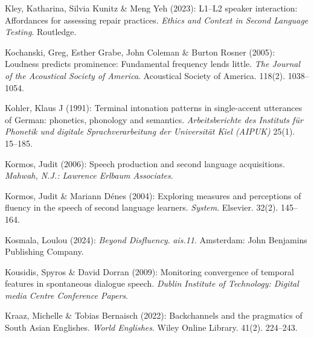 \begin{styleBibliography}
Kley, Katharina, Silvia Kunitz \& Meng Yeh (2023): L1–L2 speaker interaction: Affordances for assessing repair practices. \textit{Ethics and Context in Second Language Testing}. Routledge.
\end{styleBibliography}

\begin{styleBibliography}
Kochanski, Greg, Esther Grabe, John Coleman \& Burton Rosner (2005): Loudness predicts prominence: Fundamental frequency lends little. \textit{The Journal of the Acoustical Society of America}. Acoustical Society of America. 118(2). 1038–1054.
\end{styleBibliography}

\begin{styleBibliography}
Kohler, Klaus J (1991): Terminal intonation patterns in single-accent utterances of German: phonetics, phonology and semantics. \textit{Arbeitsberichte des Instituts für Phonetik und digitale Sprachverarbeitung der Universität Kiel (AIPUK)} 25(1). 15–185.
\end{styleBibliography}

\begin{styleBibliography}
Kormos, Judit (2006): Speech production and second language acquisitions. \textit{Mahwah, N.J.: Lawrence Erlbaum Associates}.
\end{styleBibliography}

\begin{styleBibliography}
Kormos, Judit \& Mariann Dénes (2004): Exploring measures and perceptions of fluency in the speech of second language learners. \textit{System}. Elsevier. 32(2). 145–164.
\end{styleBibliography}

\begin{styleBibliography}
Kosmala, Loulou (2024): \textit{Beyond Disfluency}. \textit{ais.11}. Amsterdam: John Benjamins Publishing Company.
\end{styleBibliography}

\begin{styleBibliography}
Kousidis, Spyros \& David Dorran (2009): Monitoring convergence of temporal features in spontaneous dialogue speech. \textit{Dublin Institute of Technology: Digital media Centre Conference Papers}.
\end{styleBibliography}

\begin{styleBibliography}
Kraaz, Michelle \& Tobias Bernaisch (2022): Backchannels and the pragmatics of South Asian Englishes. \textit{World Englishes}. Wiley Online Library. 41(2). 224–243.
\end{styleBibliography}


